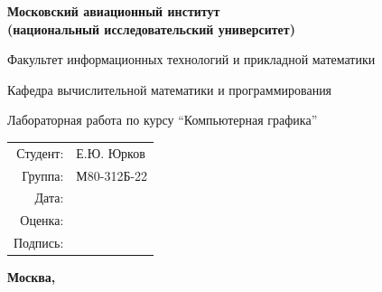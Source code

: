\documentclass[12pt]{article}
\begin{document}
\begin{titlepage}

    \begin{center}

        \bfseries
        {\small Московский авиационный институт\\ 
        (национальный исследовательский университет)}

        {\small Факультет информационных технологий и прикладной 
        математики}
        
        {\small Кафедра вычислительной математики и программирования}
        
        \vspace{8cm}
        {\Large Лабораторная работа  по курсу} 
        \enquote{\Large Компьютерная графика}
        
    \end{center}
    
    \vspace{84pt}
    \begin{flushright}
        \begin{tabular}{rl}
            Студент: & Е.Ю. Юрков \\
            Группа: & М80-312Б-22 \\
            Дата: & \\
            Оценка: & \\
            Подпись: & \\
        \end{tabular}
    \end{flushright}
    
    \vfill
    
    \begin{center}
        
        \bfseries
        Москва, \the\year
    
    \end{center}

\end{titlepage}

\end{document}
